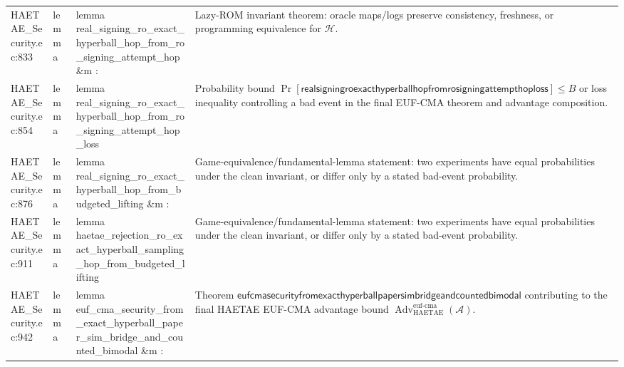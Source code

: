 \documentclass[10pt]{article}
\newcommand{\Adv}{\operatorname{Adv}}
\begin{document}
\begin{longtable}{L{0.11\textwidth}L{0.055\textwidth}L{0.385\textwidth}L{0.41\textwidth}}
HAETAE\_\allowbreak{}Security.\allowbreak{}ec:\allowbreak{}833 & lemma & {\ttfamily\scriptsize lemma real\_\allowbreak{}signing\_\allowbreak{}ro\_\allowbreak{}exact\_\allowbreak{}hyperball\_\allowbreak{}hop\_\allowbreak{}from\_\allowbreak{}ro\_\allowbreak{}signing\_\allowbreak{}attempt\_\allowbreak{}hop \&m :} & Lazy-ROM invariant theorem: oracle maps/logs preserve consistency, freshness, or programming equivalence for $\mathcal H$. \\
HAETAE\_\allowbreak{}Security.\allowbreak{}ec:\allowbreak{}854 & lemma & {\ttfamily\scriptsize lemma real\_\allowbreak{}signing\_\allowbreak{}ro\_\allowbreak{}exact\_\allowbreak{}hyperball\_\allowbreak{}hop\_\allowbreak{}from\_\allowbreak{}ro\_\allowbreak{}signing\_\allowbreak{}attempt\_\allowbreak{}hop\_\allowbreak{}loss} & Probability bound $\Pr[\mathsf{realsigningroexacthyperballhopfromrosigningattempthoploss}]\le B$ or loss inequality controlling a bad event in the final EUF-CMA theorem and advantage composition. \\
HAETAE\_\allowbreak{}Security.\allowbreak{}ec:\allowbreak{}876 & lemma & {\ttfamily\scriptsize lemma real\_\allowbreak{}signing\_\allowbreak{}ro\_\allowbreak{}exact\_\allowbreak{}hyperball\_\allowbreak{}hop\_\allowbreak{}from\_\allowbreak{}budgeted\_\allowbreak{}lifting \&m :} & Game-equivalence/fundamental-lemma statement: two experiments have equal probabilities under the clean invariant, or differ only by a stated bad-event probability. \\
HAETAE\_\allowbreak{}Security.\allowbreak{}ec:\allowbreak{}911 & lemma & {\ttfamily\scriptsize lemma haetae\_\allowbreak{}rejection\_\allowbreak{}ro\_\allowbreak{}exact\_\allowbreak{}hyperball\_\allowbreak{}sampling\_\allowbreak{}hop\_\allowbreak{}from\_\allowbreak{}budgeted\_\allowbreak{}lifting} & Game-equivalence/fundamental-lemma statement: two experiments have equal probabilities under the clean invariant, or differ only by a stated bad-event probability. \\
HAETAE\_\allowbreak{}Security.\allowbreak{}ec:\allowbreak{}942 & lemma & {\ttfamily\scriptsize lemma euf\_\allowbreak{}cma\_\allowbreak{}security\_\allowbreak{}from\_\allowbreak{}exact\_\allowbreak{}hyperball\_\allowbreak{}paper\_\allowbreak{}sim\_\allowbreak{}bridge\_\allowbreak{}and\_\allowbreak{}counted\_\allowbreak{}bimodal \&m :} & Theorem $\mathsf{eufcmasecurityfromexacthyperballpapersimbridgeandcountedbimodal}$ contributing to the final HAETAE EUF-CMA advantage bound $\Adv_{\mathrm{HAETAE}}^{\mathrm{euf\mbox{-}cma}}(\mathcal A)$. \\

\end{longtable}
\end{document}
